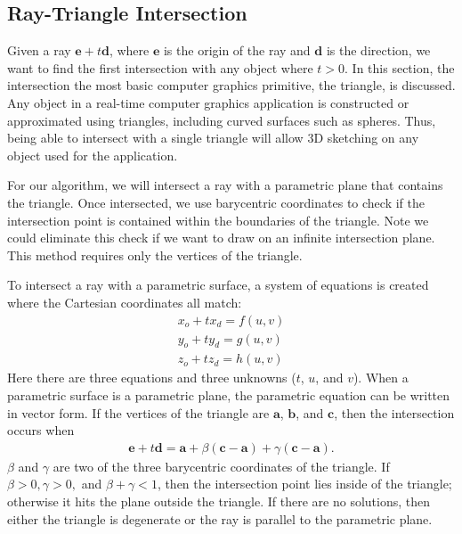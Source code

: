 \documentclass[12pt]{report}
\begin{document}
\subsection{Ray-Triangle Intersection}

Given a ray $\mathbf{e} + t\mathbf{d}$, where $\mathbf{e}$ is the origin of the ray and $\mathbf{d}$ is the direction, we want to find the first intersection with any object where $t > 0$.
In this section, the intersection the most basic computer graphics primitive, the triangle, is discussed.
Any object in a real-time computer graphics application is constructed or approximated using triangles, including curved surfaces such as spheres.
Thus, being able to intersect with a single triangle will allow 3D sketching on any object used for the application.

For our algorithm, we will intersect a ray with a parametric plane that contains the triangle.
Once intersected, we use barycentric coordinates to check if the intersection point is contained within the boundaries of the triangle. 
Note we could eliminate this check if we want to draw on an infinite intersection plane.
This method requires only the vertices of the triangle.

To intersect a ray with a parametric surface, a system of equations is created where the Cartesian coordinates all match:
\begin{align}
x_o + tx_d = f(u,v) \\
y_o + ty_d = g(u,v) \\
z_o + tz_d = h(u,v)
\end{align}
Here there are three equations and three unknowns ($t$, $u$, and $v$).
When a parametric surface is a parametric plane, the parametric equation can be written in vector form.
If the vertices of the triangle are $\mathbf{a}$, $\mathbf{b}$, and $\mathbf{c}$, then the intersection occurs when
\begin{align}
\mathbf{e} + t\mathbf{d} = \mathbf{a} + \beta(\mathbf{c}-\mathbf{a}) + \gamma(\mathbf{c}-\mathbf{a}).
\end{align}
$\beta$ and $\gamma$ are two of the three barycentric coordinates of the triangle. 
If $\beta > 0, \gamma > 0,$ and $\beta + \gamma < 1$, then the intersection point lies inside of the triangle; otherwise it hits the plane outside the triangle.
If there are no solutions, then either the triangle is degenerate or the ray is parallel to the parametric plane.
\end{document}
